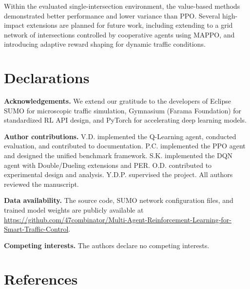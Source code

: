 \documentclass[10pt,a4paper]{article}
\begin{document}
Within the evaluated single-intersection environment, the value-based methods demonstrated better performance and lower variance than PPO. Several high-impact extensions are planned for future work, including extending to a grid network of intersections controlled by cooperative agents using MAPPO, and introducing adaptive reward shaping for dynamic traffic conditions.

\section{Declarations}

\textbf{Acknowledgements.}
We extend our gratitude to the developers of Eclipse SUMO for microscopic traffic simulation, Gymnasium (Farama Foundation) for standardized RL API design, and PyTorch for accelerating deep learning models.

\textbf{Author contributions.}
V.D. implemented the Q-Learning agent, conducted evaluation, and contributed to documentation. P.C. implemented the PPO agent and designed the unified benchmark framework. S.K. implemented the DQN agent with Double/Dueling extensions and PER. O.D. contributed to experimental design and analysis. Y.D.P. supervised the project. All authors reviewed the manuscript.

\textbf{Data availability.}
The source code, SUMO network configuration files, and trained model weights are publicly available at \url{https://github.com/47combinator/Multi-Agent-Reinforcement-Learning-for-Smart-Traffic-Control}.

\textbf{Competing interests.}
The authors declare no competing interests.

\section{References}
\end{document}
